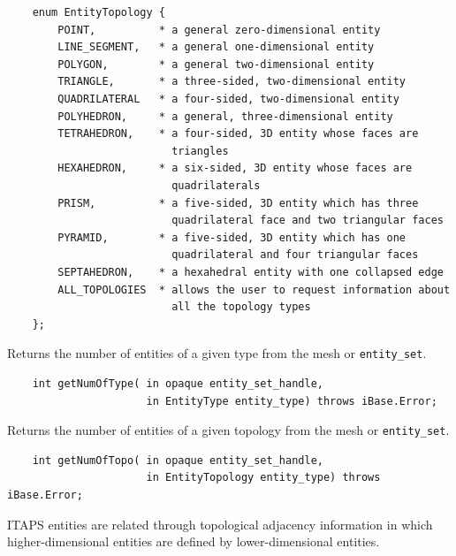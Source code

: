 \documentclass{article}
\begin{document}
\begin{verbatim}
    enum EntityTopology {
        POINT,          * a general zero-dimensional entity 
        LINE_SEGMENT,   * a general one-dimensional entity 
        POLYGON,        * a general two-dimensional entity  
        TRIANGLE,       * a three-sided, two-dimensional entity  
        QUADRILATERAL   * a four-sided, two-dimensional entity
        POLYHEDRON,     * a general, three-dimensional entity 
        TETRAHEDRON,    * a four-sided, 3D entity whose faces are   
                          triangles 
        HEXAHEDRON,     * a six-sided, 3D entity whose faces are   
                          quadrilaterals 
        PRISM,          * a five-sided, 3D entity which has three   
                          quadrilateral face and two triangular faces 
        PYRAMID,        * a five-sided, 3D entity which has one    
                          quadrilateral and four triangular faces 
        SEPTAHEDRON,    * a hexahedral entity with one collapsed edge 
        ALL_TOPOLOGIES  * allows the user to request information about   
                          all the topology types
    };
\end{verbatim}

Returns the number of entities of a given type from the mesh 
or {\tt entity\_set}.
\begin{verbatim}
    int getNumOfType( in opaque entity_set_handle,  
                      in EntityType entity_type) throws iBase.Error;
\end{verbatim}


Returns the number of entities of a given topology from the mesh 
or {\tt entity\_set}.

\begin{verbatim}
    int getNumOfTopo( in opaque entity_set_handle,  
                      in EntityTopology entity_type) throws iBase.Error;
\end{verbatim}


ITAPS entities are related through topological adjacency information 
in which higher-dimensional entities are defined by lower-dimensional 
entities. \\
\end{document}
